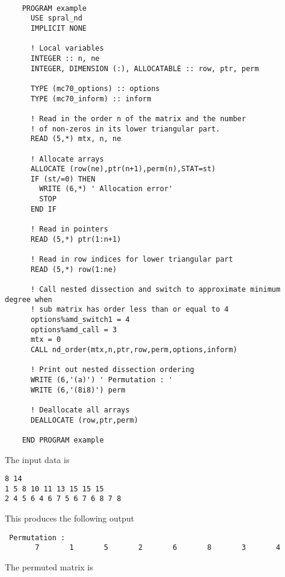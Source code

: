 \def\baselinestretch{0.8}
{\small \begin{verbatim}

    PROGRAM example
      USE spral_nd
      IMPLICIT NONE

      ! Local variables
      INTEGER :: n, ne
      INTEGER, DIMENSION (:), ALLOCATABLE :: row, ptr, perm

      TYPE (mc70_options) :: options
      TYPE (mc70_inform) :: inform

      ! Read in the order n of the matrix and the number
      ! of non-zeros in its lower triangular part.
      READ (5,*) mtx, n, ne

      ! Allocate arrays
      ALLOCATE (row(ne),ptr(n+1),perm(n),STAT=st)
      IF (st/=0) THEN
        WRITE (6,*) ' Allocation error'
        STOP
      END IF

      ! Read in pointers
      READ (5,*) ptr(1:n+1)

      ! Read in row indices for lower triangular part
      READ (5,*) row(1:ne)

      ! Call nested dissection and switch to approximate minimum degree when
      ! sub matrix has order less than or equal to 4
      options%amd_switch1 = 4
      options%amd_call = 3
      mtx = 0
      CALL nd_order(mtx,n,ptr,row,perm,options,inform)

      ! Print out nested dissection ordering
      WRITE (6,'(a)') ' Permutation : '
      WRITE (6,'(8i8)') perm

      ! Deallocate all arrays
      DEALLOCATE (row,ptr,perm)

    END PROGRAM example
\end{verbatim}  }
\def\baselinestretch{1.0}
\medskip

\noindent
{ The input data is}

\def\baselinestretch{0.8}
{\small  \begin{verbatim}
8 14
1 5 8 10 11 13 15 15 15
2 4 5 6 4 6 7 5 6 7 6 8 7 8

\end{verbatim}  }
\medskip

\noindent
{This produces the following output}

\def\baselinestretch{0.8}
{\small { \begin{verbatim}
 Permutation :  
       7       1       5       2       6       8       3       4

\end{verbatim} } }
\medskip

\noindent
{\rm The permuted matrix is}

